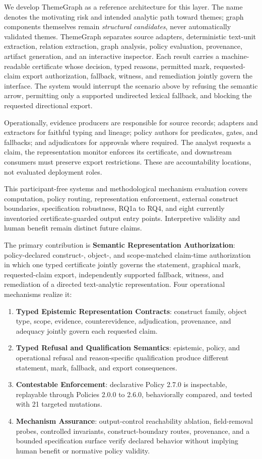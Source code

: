 \documentclass[manuscript,screen,review]{acmart}
\begin{document}
We develop ThemeGraph as a reference architecture for this layer. The name denotes the motivating risk and intended analytic path toward themes; graph components themselves remain \emph{structural candidates}, never automatically validated themes. ThemeGraph separates source adapters, deterministic text-unit extraction, relation extraction, graph analysis, policy evaluation, provenance, artifact generation, and an interactive inspector. Each result carries a machine-readable certificate whose decision, typed reasons, permitted mark, requested-claim export authorization, fallback, witness, and remediation jointly govern the interface. The system would interrupt the scenario above by refusing the semantic arrow, permitting only a supported undirected lexical fallback, and blocking the requested directional export.

Operationally, evidence producers are responsible for source records; adapters and extractors for faithful typing and lineage; policy authors for predicates, gates, and fallbacks; and adjudicators for approvals where required. The analyst requests a claim, the representation monitor enforces its certificate, and downstream consumers must preserve export restrictions. These are accountability locations, not evaluated deployment roles.

This participant-free systems and methodological mechanism evaluation covers computation, policy routing, representation enforcement, external construct boundaries, specification robustness, RQ1a to RQ4, and eight currently inventoried certificate-guarded output entry points. Interpretive validity and human benefit remain distinct future claims.

The primary contribution is \textbf{Semantic Representation Authorization}: policy-declared construct-, object-, and scope-matched claim-time authorization in which one typed certificate jointly governs the statement, graphical mark, requested-claim export, independently supported fallback, witness, and remediation of a directed text-analytic representation. Four operational mechanisms realize it:

\begin{enumerate}
  \item \textbf{Typed Epistemic Representation Contracts}: construct family, object type, scope, evidence, counterevidence, adjudication, provenance, and adequacy jointly govern each requested claim.
  \item \textbf{Typed Refusal and Qualification Semantics}: epistemic, policy, and operational refusal and reason-specific qualification produce different statement, mark, fallback, and export consequences.
  \item \textbf{Contestable Enforcement}: declarative Policy 2.7.0 is inspectable, replayable through Policies 2.0.0 to 2.6.0, behaviorally compared, and tested with 21 targeted mutations.
  \item \textbf{Mechanism Assurance}: output-control reachability ablation, field-removal probes, controlled invariants, construct-boundary routes, provenance, and a bounded specification surface verify declared behavior without implying human benefit or normative policy validity.
\end{enumerate}
\end{document}
